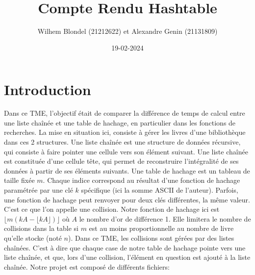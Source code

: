 \documentclass{article}
\title{\Huge Compte Rendu Hashtable}
\date{19-02-2024}
\author{Wilhem Blondel (21212622) et Alexandre Genin (21131809)}
\begin{document}
    \maketitle
    \newpage

    \section{Introduction}
    Dans ce TME, l'objectif était de comparer la différence de temps de calcul
    entre une liste chaînée et une table de hachage, en particulier dans les fonctions
    de recherches. La mise en situation ici, consiste à gérer les livres d'une
    bibliothèque dans ces 2 structures.
    \newline \newline
    Une liste chaînée est une structure de données récursive, qui consiste à
    faire pointer une cellule vers son élément suivant. Une liste chaînée est 
    constituée d'une cellule tête, qui permet de reconstruire l'intégralité de ses
    données à partir de ses éléments suivants.
    \newline
    Une table de hachage est un tableau de taille fixée $m$. Chaque indice
    correspond au résultat d'une fonction de hachage paramétrée par une
    clé $k$ spécifique (ici la somme ASCII de l'auteur). Parfois, une fonction de hachage peut renvoyer pour deux clés
    différentes, la même valeur. C'est ce que l'on appelle une collision.
    Notre fonction de hachage ici est $\lfloor m(kA-\lfloor kA \rfloor) \rfloor$ où $A$ 
    le nombre d'or de différence 1. Elle limitera le nombre de collisions dans la table si $m$
    est au moins proportionnelle au nombre de livre qu'elle stocke (noté $n$).
    \newline
    Dans ce TME, les collisions sont gérées par des listes chaînées. C'est à dire que
    chaque case de notre table de hachage pointe vers une liste chaînée, et que,
    lors d'une collision, l'élément en question est ajouté à la liste chaînée.
    \newline
    Notre projet est composé de différents fichiers:
\end{document}
